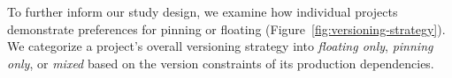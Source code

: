 To further inform our study design, we examine how individual projects demonstrate preferences for pinning or floating (Figure~\ref{fig:versioning-strategy}).
We categorize a project's overall versioning strategy into \emph{floating only}, \emph{pinning only}, or \emph{mixed} based on the version constraints of its production dependencies.
